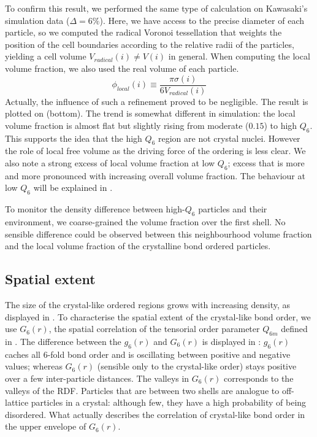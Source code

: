 To confirm this result, we performed the same type of calculation on Kawasaki's simulation data ($\Delta=6\%$). Here, we have access to the precise diameter of each particle, so we computed the radical Voronoi tessellation that weights the position of the cell boundaries according to the relative radii of the particles, yielding a cell volume $V_{radical}(i)\neq V(i)$ in general. When computing the local volume fraction, we also used the real volume of each particle. 
\begin{equation}
\phi_{local}(i) \equiv \frac{\pi\sigma(i)}{6 V_{radical}(i)}
\end{equation}
Actually, the influence of such a refinement proved to be negligible. The result is plotted on  (bottom). The trend is somewhat different in simulation: the local volume fraction is almost flat but slightly rising from moderate ($0.15$) to high $Q_6$. This supports the idea that the high $Q_6$ region are not crystal nuclei. However the role of local free volume as the driving force of the ordering is less clear. We also note a strong excess of local volume fraction at low $Q_6$; excess that is more and more pronounced with increasing overall volume fraction. The behaviour at low $Q_6$ will be explained in .

To monitor the density difference between high-$Q_6$ particles and their environment, we coarse-grained the volume fraction over the first shell. No sensible difference could be observed between this neighbourhood volume fraction and the local volume fraction of the crystalline bond ordered particles.


\subsection{Spatial extent}
\label{sec:mrco_spatial}

The size of the crystal-like ordered regions grows with increasing density, as displayed in . To characterise the spatial extent of the crystal-like bond order, we use $G_6(r)$, the spatial correlation of the tensorial order parameter $Q_{6 m}$ defined in . The difference between the $g_6(r)$ and $G_6(r)$ is displayed in : $g_6(r)$ caches all 6-fold bond order and is oscillating between positive and negative values; whereas $G_6(r)$ (sensible only to the crystal-like order) stays positive over a few inter-particle distances. The valleys in $G_6(r)$ corresponds to the valleys of the \ac{RDF}. Particles that are between two shells are analogue to off-lattice particles in a crystal: although few, they have a high probability of being disordered. What actually describes the correlation of crystal-like bond order in the upper envelope of $G_6(r)$.

